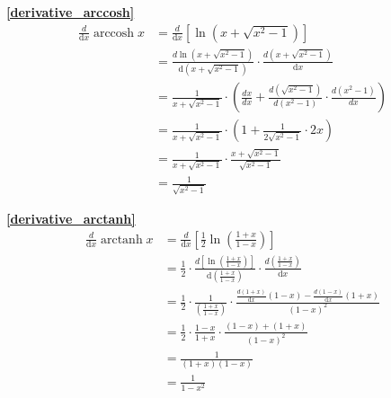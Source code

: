 \textbf{\large \ref{derivative_arccosh}}
\begin{displaymath}
    \begin{split}
        \frac{d}{\mathrm{d}{x}}\operatorname{arccosh}{x} &=\frac{d}{\mathrm{d}{x}}\left[\ln(x+\sqrt{x^2-1})\right]\\
                                    &=\frac{d \ln(x+\sqrt{x^2-1})}{\mathrm{d}{\left(x+\sqrt{x^2-1}\right)}}\cdot\frac{d \left(x+\sqrt{x^2-1}\right)}{\mathrm{d}{x}}\\
                                    &=\frac{1}{x+\sqrt{x^2-1}}\cdot\left(\frac{dx}{dx}+\frac{d \left(\sqrt{x^2-1}\right)}{d\left(x^2-1\right)}\cdot\frac{d(x^2-1)}{dx}\right)\\
                                    &=\frac{1}{x+\sqrt{x^2-1}}\cdot\left(1+\frac{1}{2\sqrt{x^2-1}}\cdot 2x\right)\\                                    
                                    &=\frac{1}{x+\sqrt{x^2-1}}\cdot\frac{x+\sqrt{x^2-1}}{\sqrt{x^2-1}}\\
                                    &=\frac{1}{\sqrt{x^2-1}}
                                \end{split}
\end{displaymath}

\textbf{\large \ref{derivative_arctanh}}
\begin{displaymath}
    \begin{split}
        \frac{d}{\mathrm{d}{x}}\operatorname{arctanh}{x} &=\frac{d}{\mathrm{d}{x}}\left[\frac{1}{2}\ln(\frac{1+x}{1-x})\right]\\
        &=\frac{1}{2}\cdot\frac{d\left[\ln(\frac{1+x}{1-x})\right]}{\mathrm{d}{\left(\frac{1+x}{1-x}\right)}}\cdot\frac{d\left(\frac{1+x}{1-x}\right)}{\mathrm{d}{x}}\\
        &=\frac{1}{2}\cdot\frac{1}{\left(\frac{1+x}{1-x}\right)}\cdot\frac{\frac{d(1+x)}{\mathrm{d}{x}}(1-x)-\frac{d(1-x)}{\mathrm{d}{x}}(1+x)}{(1-x)^2}\\
        &=\frac{1}{2}\cdot\frac{1-x}{1+x}\cdot\frac{(1-x)+(1+x)}{(1-x)^2}\\
        &=\frac{1}{(1+x)(1-x)}\\
        &=\frac{1}{1-x^2}
    \end{split}
\end{displaymath}

